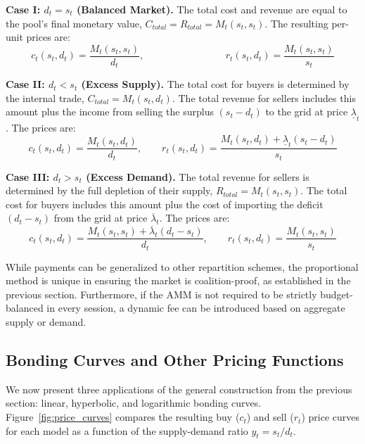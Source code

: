 \documentclass[12pt, notitlepage]{article}
\begin{document}
\noindent\textbf{Case I: $d_t = s_t$ (Balanced Market).}
The total cost and revenue are equal to the pool's final monetary value, $C_{total} = R_{total} = M_t(s_t,s_t)$. The resulting per-unit prices are:
\begin{equation}
    c_t(s_t, d_t) = \frac{M_t(s_t,s_t)}{d_t}, \phantom{+ \overline{\lambda}_t(d_t - s_t)} \qquad 
    r_t(s_t, d_t) = \frac{M_t(s_t,s_t)}{s_t}
\end{equation}

\noindent\textbf{Case II: $d_t < s_t$ (Excess Supply).}
The total cost for buyers is determined by the internal trade, $C_{total} = M_t(s_t, d_t)$. The total revenue for sellers includes this amount plus the income from selling the surplus $(s_t - d_t)$ to the grid at price $\underline{\lambda}_t$. The prices are:
\begin{equation}
    c_t(s_t, d_t) = \frac{M_t(s_t, d_t)}{d_t}, \qquad 
    r_t(s_t, d_t) = \frac{M_t(s_t,d_t) + \underline{\lambda}_t(s_t - d_t)}{s_t}
\end{equation}

\noindent\textbf{Case III: $d_t > s_t$ (Excess Demand).}
The total revenue for sellers is determined by the full depletion of their supply, $R_{total} = M_t(s_t, s_t)$. The total cost for buyers includes this amount plus the cost of importing the deficit $(d_t - s_t)$ from the grid at price $\overline{\lambda}_t$. The prices are:
\begin{equation}
    c_t(s_t, d_t) = \frac{M_t(s_t,s_t) + \overline{\lambda}_t(d_t - s_t)}{d_t}, \qquad
    r_t(s_t, d_t) = \frac{M_t(s_t,s_t)}{s_t}
\end{equation}

While payments can be generalized to other repartition schemes, the proportional method is unique in ensuring the market is coalition-proof, as established in the previous section. Furthermore, if the AMM is not required to be strictly budget-balanced in every session, a dynamic fee can be introduced based on aggregate supply or demand.


\subsection{Bonding Curves and Other Pricing Functions}

We now present three applications of the general construction from the previous section: linear, hyperbolic, and logarithmic bonding curves. Figure~\ref{fig:price_curves} compares the resulting buy ($c_t$) and sell ($r_t$) price curves for each model as a function of the supply-demand ratio $y_t =s_t/d_t$.
\end{document}

